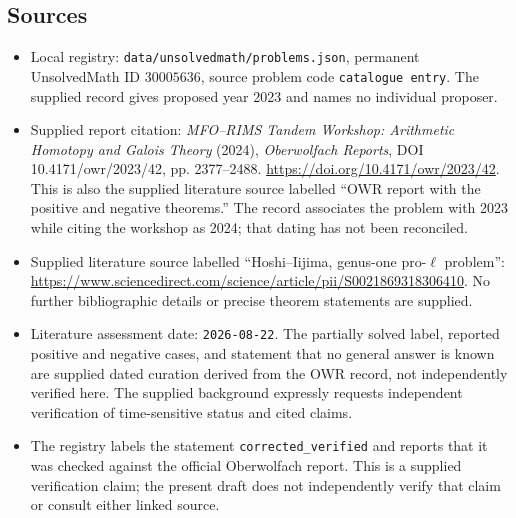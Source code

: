 \documentclass[11pt]{article}
\begin{document}
\subsection{Sources}
\begin{itemize}
\item Local registry: \texttt{data/unsolvedmath/problems.json}, permanent UnsolvedMath ID \(30005636\), source problem code \texttt{catalogue entry}. The supplied record gives proposed year 2023 and names no individual proposer.
\item Supplied report citation: \emph{MFO--RIMS Tandem Workshop: Arithmetic Homotopy and Galois Theory} (2024), \emph{Oberwolfach Reports}, DOI 10.4171/owr/2023/42, pp. 2377--2488. \url{https://doi.org/10.4171/owr/2023/42}. This is also the supplied literature source labelled ``OWR report with the positive and negative theorems.'' The record associates the problem with 2023 while citing the workshop as 2024; that dating has not been reconciled.
\item Supplied literature source labelled ``Hoshi--Iijima, genus-one pro-\(\ell\) problem'': \url{https://www.sciencedirect.com/science/article/pii/S0021869318306410}. No further bibliographic details or precise theorem statements are supplied.
\item Literature assessment date: \texttt{2026-08-22}. The partially solved label, reported positive and negative cases, and statement that no general answer is known are supplied dated curation derived from the OWR record, not independently verified here. The supplied background expressly requests independent verification of time-sensitive status and cited claims.
\item The registry labels the statement \texttt{corrected\_verified} and reports that it was checked against the official Oberwolfach report. This is a supplied verification claim; the present draft does not independently verify that claim or consult either linked source.
\end{itemize}
\end{document}

